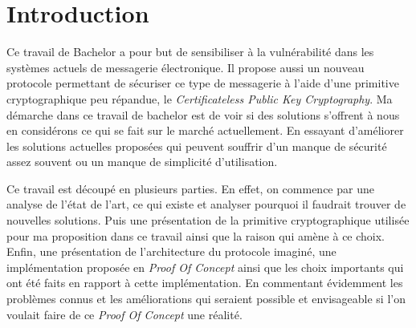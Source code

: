 \chapter{Introduction}
\label{ch:intro}

Ce travail de Bachelor a pour but de sensibiliser à la vulnérabilité dans les systèmes actuels de messagerie électronique. Il propose aussi un nouveau protocole permettant de sécuriser ce type de messagerie à l'aide d'une primitive cryptographique peu répandue, le \textit{Certificateless Public Key Cryptography}. Ma démarche dans ce travail de bachelor est de voir si des solutions s'offrent à nous en considérons ce qui se fait sur le marché actuellement. En essayant d'améliorer les solutions actuelles proposées qui peuvent souffrir d'un manque de sécurité assez souvent ou un manque de simplicité d'utilisation.

Ce travail est découpé en plusieurs parties. En effet, on commence par une analyse de l'état de l'art, ce qui existe et analyser pourquoi il faudrait trouver de nouvelles solutions. Puis une présentation de la primitive cryptographique utilisée pour ma proposition dans ce travail ainsi que la raison qui amène à ce choix. Enfin, une présentation de l'architecture du protocole imaginé, une implémentation proposée en \textit{Proof Of Concept} ainsi que les choix importants qui ont été faits en rapport à cette implémentation. En commentant évidemment les problèmes connus et les améliorations qui seraient possible et envisageable si l'on voulait faire de ce \textit{Proof Of Concept} une réalité.